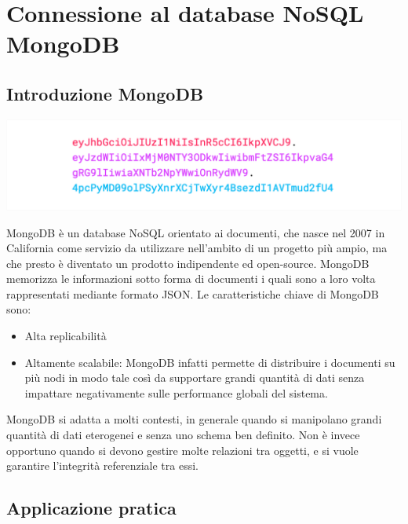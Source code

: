 \documentclass[twoside]{report}
\begin{document}
\section{Connessione al database NoSQL MongoDB}
\subsection{Introduzione MongoDB}

\begin{center}
\begin{minipage}{0.75\linewidth}
    \vspace{2mm}
    \centering
    \includegraphics[width= \linewidth]{1.png}
    \vspace{2mm}
\end{minipage}
\end{center}

MongoDB è un database NoSQL orientato ai documenti, che nasce nel 2007 in California come servizio da utilizzare nell'ambito di un progetto più ampio, ma che presto è diventato un prodotto indipendente ed open-source. MongoDB memorizza le informazioni sotto forma di documenti i quali sono a loro volta rappresentati mediante formato JSON.
\bigbreak
Le caratteristiche chiave di MongoDB sono:

\begin{itemize}
\item Alta replicabilità
\item Altamente scalabile: MongoDB infatti permette di distribuire i documenti su più nodi in modo tale così da supportare grandi quantità di dati senza impattare negativamente sulle performance globali del sistema.
\end{itemize}

MongoDB si adatta a molti contesti, in generale quando si manipolano grandi quantità di dati eterogenei e senza uno schema ben definito. 
\bigbreak
Non è invece opportuno quando si devono gestire molte relazioni tra oggetti, e si vuole garantire l’integrità referenziale tra essi.

\subsection{Applicazione pratica}
\end{document}
